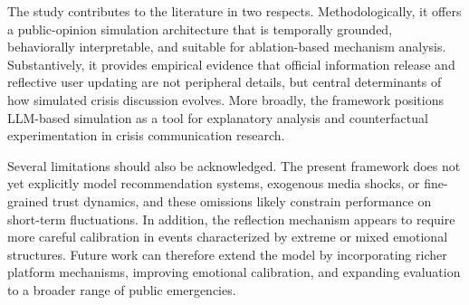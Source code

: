 \documentclass[11pt]{article}
\begin{document}
The study contributes to the literature in two respects. Methodologically, it offers a public-opinion simulation architecture that is temporally grounded, behaviorally interpretable, and suitable for ablation-based mechanism analysis. Substantively, it provides empirical evidence that official information release and reflective user updating are not peripheral details, but central determinants of how simulated crisis discussion evolves. More broadly, the framework positions LLM-based simulation as a tool for explanatory analysis and counterfactual experimentation in crisis communication research.

Several limitations should also be acknowledged. The present framework does not yet explicitly model recommendation systems, exogenous media shocks, or fine-grained trust dynamics, and these omissions likely constrain performance on short-term fluctuations. In addition, the reflection mechanism appears to require more careful calibration in events characterized by extreme or mixed emotional structures. Future work can therefore extend the model by incorporating richer platform mechanisms, improving emotional calibration, and expanding evaluation to a broader range of public emergencies.










\end{document}
